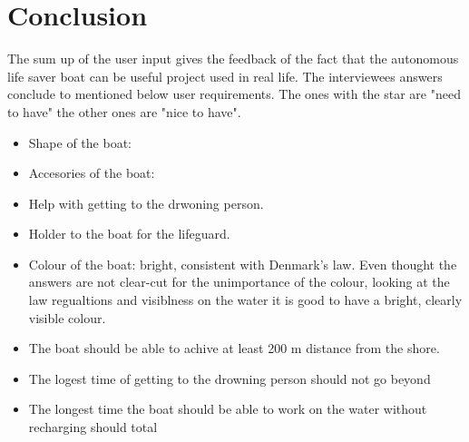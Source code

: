 \documentclass{article}[10pt]
\begin{document}
\section*{Conclusion}
The sum up of the user input gives the feedback of the fact that the autonomous life saver boat can be useful project used in real life. The interviewees answers conclude to mentioned below user requirements. The ones with the star are "need to have" the other ones are "nice to have".
\begin{itemize}
     \item Shape of the boat:
     \item Accesories of the boat:
     \item Help with getting to the drwoning person.
     \item Holder to the boat for the lifeguard.
     \item Colour of the boat: bright, consistent with Denmark's law. Even thought the answers are not clear-cut for the unimportance of the colour, looking at the law regualtions and visiblness on the water it is good to have a bright, clearly visible colour.
     \item The boat should be able to achive at least 200 m distance from the shore.
     \item The logest time of getting to the drowning person should not go beyond
     \item The longest time the boat should be able to work on the water without recharging should total
\end{itemize}
\end{document}
